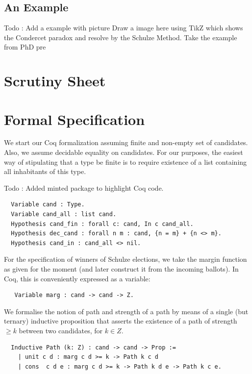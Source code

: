 	\subsection{An Example}
	 Todo : Add a example with picture
	 Draw a image here using TikZ which shows the Condercet paradox 
	 and resolve by the Schulze Method. Take the example from PhD pre
	 
	
\section{Scrutiny Sheet }	 
	
\section{Formal Specification}
	We start our Coq formalization assuming finite and non-empty 
	set of candidates. Also, we assume decidable equality on 
	candidates. For our purposes, the
	easiest way of stipulating that a type be finite is to require
	existence of a list containing all inhabitants of this type.

Todo : Added minted package to highlight Coq code.

\begin{verbatim}
  Variable cand : Type.
  Variable cand_all : list cand.
  Hypothesis cand_fin : forall c: cand, In c cand_all.
  Hypothesis dec_cand : forall n m : cand, {n = m} + {n <> m}.
  Hypothesis cand_in : cand_all <> nil.
\end{verbatim}


\noindent
For the specification of winners of Schulze elections, we take the
margin function as given for the moment (and later construct it from
the incoming ballots). In Coq, this is conveniently expressed as a
variable:
\begin{verbatim}
   Variable marg : cand -> cand -> Z.
\end{verbatim}

\noindent
We formalise the notion of path and strength of a path by means of a
single (but ternary) inductive proposition that asserts the
existence of a path of strength $\geq k$ between two candidates, for
$k \in Z$.

\begin{verbatim}
  Inductive Path (k: Z) : cand -> cand -> Prop :=
    | unit c d : marg c d >= k -> Path k c d
    | cons  c d e : marg c d >= k -> Path k d e -> Path k c e.
\end{verbatim}

